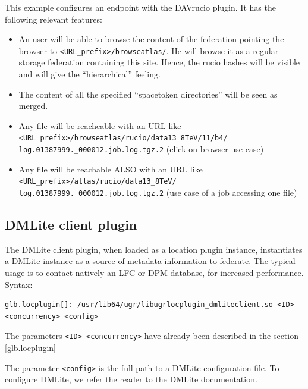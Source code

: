 \documentclass[12pt]{article} %
\begin{document}
This example configures an endpoint with the DAVrucio plugin. It has the following relevant features:

\begin{itemize}
 \item An user will be able to browse the content of the federation pointing the browser to \lstinline{<URL_prefix>/browseatlas/}. He will browse it as a regular storage federation containing this site. Hence, the rucio hashes will be visible and will give the ``hierarchical'' feeling.
 \item The content of all the specified ``spacetoken directories'' will be seen as merged.
 \item Any file will be reacheable with an URL like \\
       \lstinline{<URL_prefix>/browseatlas/rucio/data13_8TeV/11/b4/}\\
       \lstinline{log.01387999._000012.job.log.tgz.2} (click-on browser use case)
 \item Any file will be reachable ALSO with an URL like \\
       \lstinline{<URL_prefix>/atlas/rucio/data13_8TeV/}\\
       \lstinline{log.01387999._000012.job.log.tgz.2} (use case of a job accessing one file)
\end{itemize}




\subsection{DMLite client plugin}

The DMLite client plugin, when loaded as a location plugin instance, instantiates a DMLite instance as a source of metadata information to federate. The typical usage is to contact natively an LFC or DPM database, for increased performance.\\

Syntax:\\
\begin{lstlisting}
glb.locplugin[]: /usr/lib64/ugr/libugrlocplugin_dmliteclient.so <ID> <concurrency> <config>
\end{lstlisting}

The parameters \lstinline"<ID> <concurrency>" have already been described in the section \ref{glb.locplugin}

The parameter \lstinline"<config>" is the full path to a DMLite configuration file. To configure DMLite, we refer the reader to the DMLite documentation.
\end{document}
